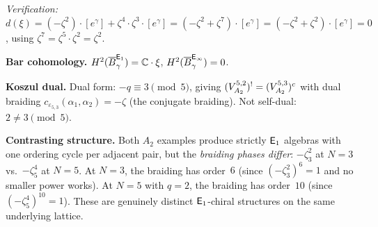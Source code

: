 \begin{computation}[\texorpdfstring{$A_2$}{A_2} with non-standard parameter: \texorpdfstring{$N = 5$}{N = 5}, \texorpdfstring{$q = 2$}{q = 2}]
\emph{Verification:}
$d(\xi)
= (-\zeta^2) \cdot [e^\gamma] + \zeta^4 \cdot \zeta^3 \cdot [e^\gamma]
= (-\zeta^2 + \zeta^7) \cdot [e^\gamma]
= (-\zeta^2 + \zeta^2) \cdot [e^\gamma] = 0$,
using $\zeta^7 = \zeta^5 \cdot \zeta^2 = \zeta^2$.

\noindent\textbf{Bar cohomology.}
$H^2(\overline{B}^{\mathsf{E}_1}_\gamma) = \mathbb{C} \cdot \xi$,\;
$H^2(\overline{B}^{\mathsf{E}_{\infty}}_\gamma) = 0$.
\smallskip

\noindent\textbf{Koszul dual.}
Dual form: $-q \equiv 3 \pmod{5}$, giving
$(V_{A_2}^{5,2})^! = (V_{A_2}^{5,3})^c$ with
dual braiding $c_{\varepsilon_{5,3}}(\alpha_1,\alpha_2) = -\zeta$
(the conjugate braiding).  Not self-dual: $2 \neq 3 \pmod{5}$.
\smallskip

\noindent\textbf{Contrasting structure.}
Both $A_2$ examples produce strictly $\mathsf{E}_1$ algebras with one
ordering cycle per adjacent pair, but the \emph{braiding phases differ}:
$-\zeta_3^2$ at $N = 3$ vs.\ $-\zeta_5^4$ at $N = 5$.
At $N = 3$, the braiding has order~$6$ (since $(-\zeta_3^2)^6 = 1$
and no smaller power works).
At $N = 5$ with $q = 2$, the braiding has order~$10$
(since $(-\zeta_5^4)^{10} = 1$).
These are genuinely distinct $\mathsf{E}_1$-chiral structures on the
same underlying lattice.
\end{computation}



